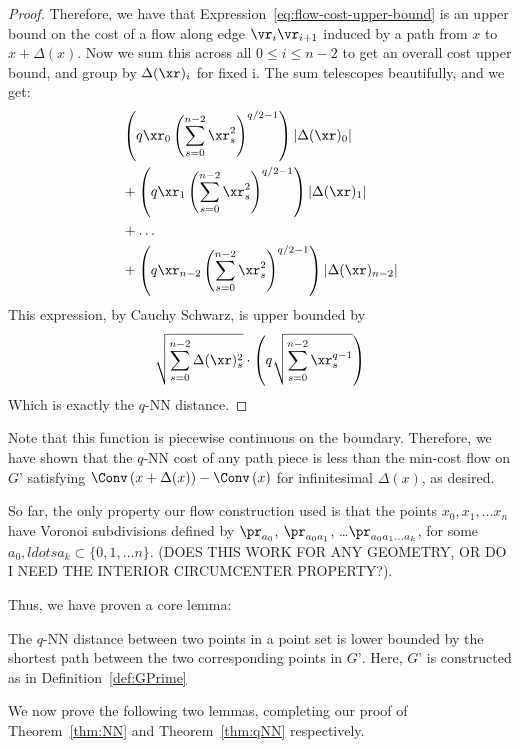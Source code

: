 \begin{proof}
Therefore, we have that Expression~\ref{eq:flow-cost-upper-bound} is an upper bound on the cost of
a flow along edge $\vr_i\vr_{i+1}$ induced by a path from $x$ to $x+\Delta(x)$. Now we sum this across
all $ 0 \leq i \leq n-2$ to get an overall cost upper bound, and group by
$\Delta(\xr)_i$ for fixed i. The sum telescopes beautifully, and we get:
\begin{align}
&\left(q\xr_0\left(\sum_{s=0}^{n-2} \xr_s^2\right)^{q/2-1}\right)| \Delta(\xr)_0|
\\&+
\left(q\xr_1\left(\sum_{s=0}^{n-2} \xr_s^2\right)^{q/2-1}\right)| \Delta(\xr)_1|
\\& +\ldots
\\& +
\left(q\xr_{n-2}\left(\sum_{s=0}^{n-2} \xr_s^2\right)^{q/2-1}\right)| \Delta(\xr)_{n-2}|
\end{align}
This expression, by Cauchy Schwarz, is upper bounded by
\[
\sqrt{\sum_{s=0}^{n-2} \Delta(\xr)_s^2} \cdot \left(q\sqrt{\sum_{s=0}^{n-2}
\xr_s^{q-1}}\right)
\]
Which is exactly the $q$-NN distance.

\end{proof}

Note that this function is piecewise continuous on the boundary. Therefore,
we have shown that the $q$-NN cost of any path piece is less than the
min-cost flow on $G’$ satisfying
$\Conv\left(x+\Delta(x)\right)-\Conv\left(x\right)$ for infinitesimal
$\Delta(x)$, as desired.

So far, the only property our flow construction used is that the points
$x_0, x_1, \ldots x_n$ have Voronoi subdivisions defined by $\pr_{a_0}$,
$\pr_{a_0a_1}$, \ldots $\pr_{a_0a_1\ldots a_k}$, for some $a_0, ldots a_k
\subset \{0, 1, \ldots n\}$. (DOES THIS WORK FOR ANY GEOMETRY, OR DO I NEED
THE INTERIOR CIRCUMCENTER PROPERTY?).

Thus, we have proven a core lemma:

\begin{lemma}\label{lem:qNN-GPrime}

The $q$-NN distance between two points in a point set is lower bounded by
the shortest path between the two corresponding points in $G’$. Here, $G’$
is constructed as in Definition~\ref{def:GPrime}

\end{lemma}

We now prove the following two lemmas, completing our proof of
Theorem~\ref{thm:NN} and Theorem~\ref{thm:qNN} respectively.

